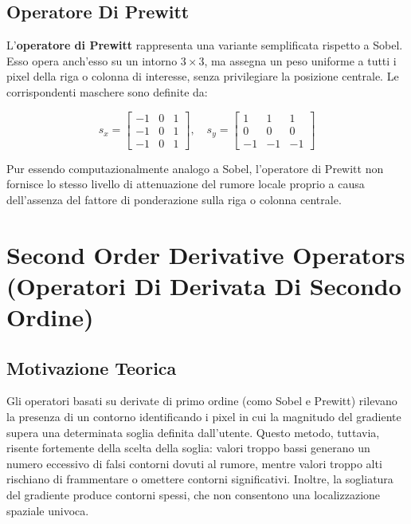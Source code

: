 ﻿\documentclass[11pt, a4paper]{article}
\begin{document}
\subsection{Operatore Di Prewitt}

L'\textbf{operatore di Prewitt} rappresenta una variante semplificata rispetto a Sobel. Esso opera anch'esso su un intorno $3 \times 3$, ma assegna un peso uniforme a tutti i pixel della riga o colonna di interesse, senza privilegiare la posizione centrale. Le corrispondenti maschere sono definite da:

\[ s_x = \begin{bmatrix} -1 & 0 & 1 \\ -1 & 0 & 1 \\ -1 & 0 & 1 \end{bmatrix}, \quad s_y = \begin{bmatrix} 1 & 1 & 1 \\ 0 & 0 & 0 \\ -1 & -1 & -1 \end{bmatrix} \]

Pur essendo computazionalmente analogo a Sobel, l'operatore di Prewitt non fornisce lo stesso livello di attenuazione del rumore locale proprio a causa dell'assenza del fattore di ponderazione sulla riga o colonna centrale.


\newpage

\section{Second Order Derivative Operators (Operatori Di Derivata Di Secondo Ordine)}

\subsection{Motivazione Teorica}

Gli operatori basati su derivate di primo ordine (como Sobel e Prewitt) rilevano la presenza di un contorno identificando i pixel in cui la magnitudo del gradiente supera una determinata soglia definita dall'utente. Questo metodo, tuttavia, risente fortemente della scelta della soglia: valori troppo bassi generano un numero eccessivo di falsi contorni dovuti al rumore, mentre valori troppo alti rischiano di frammentare o omettere contorni significativi. Inoltre, la sogliatura del gradiente produce contorni spessi, che non consentono una localizzazione spaziale univoca.
\end{document}

